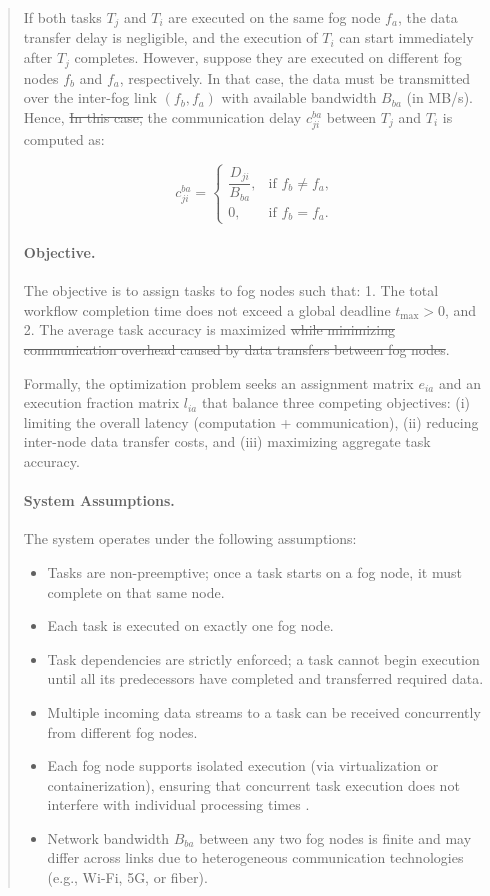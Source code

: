 \documentclass[conference]{IEEEtran}
\newcommand{\anninsert}[2]{{\color{#1}#2}}
\newcommand{\anninsert}[2]{#2}
\newcommand{\af}[1]{\anninsert{violet}{#1}}
\begin{document}
\begin{abstract}
If both tasks \( T_j \) and \( T_i \) are executed on the same fog node \( f_a \), the data transfer delay is negligible, and the execution of \( T_i \) can start immediately after \( T_j \) completes. However, suppose they are executed on different fog nodes \( f_b \) and \( f_a \), respectively. In that case, the data must be transmitted over the inter-fog link \((f_b, f_a)\) with available bandwidth \( B_{ba} \) (in \af{MB/s}). \af{Hence, \sout{In this case,}} the communication delay \( c_{ji}^{ba} \) between \( T_j \) and \( T_i \) is computed as:

\[
c_{ji}^{ba} =
\begin{cases}
    \dfrac{D_{ji}}{B_{ba}}, & \text{if } f_b \neq f_a, \\
    0, & \text{if } f_b = f_a.
\end{cases}
\]

\paragraph*{Objective.}  
The objective is to assign tasks to fog nodes such that:
1. The total workflow completion time does not exceed a global deadline \( t_{\max} > 0 \), and  
2. The average task accuracy is maximized \af{\sout{while minimizing communication overhead caused by data transfers between fog nodes}}.

Formally, the optimization problem seeks an \af{assignment matrix \( e_{ia} \) and an execution fraction matrix $l_{ia}$ that balance three competing objectives:  
(i) limiting the overall latency (computation + communication),  
(ii) reducing inter-node data transfer costs, and  
(iii) maximizing aggregate task accuracy.}

\paragraph*{System Assumptions.}  
The system operates under the following assumptions:
\begin{itemize}
    \item Tasks are non-preemptive; once a task starts on a fog node, it must complete on that same node.  
    \item Each task is executed on exactly one fog node.  
    \item Task dependencies are strictly enforced; a task cannot begin execution until all its predecessors have completed and transferred required data.  
    \item Multiple incoming data streams to a task can be received concurrently from different fog nodes.  
    \item Each fog node supports isolated execution (via virtualization or containerization), ensuring that concurrent task execution does not interfere with individual processing times \cite{xu2021task}.  
    \item Network bandwidth \( B_{ba} \) between any two fog nodes is finite and may differ across links due to heterogeneous communication technologies (e.g., Wi-Fi, 5G, or fiber).  
\end{itemize}


\end{abstract}
\end{document}
